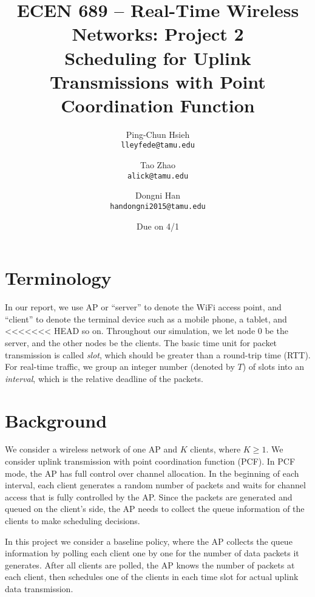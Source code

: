 \documentclass{article}
\begin{document}
\title{\bfseries ECEN 689 -- Real-Time Wireless Networks: Project 2\\
Scheduling for Uplink Transmissions with Point Coordination Function}
\date{Due on 4/1}
\author{%
Ping-Chun Hsieh\\
\texttt{lleyfede@tamu.edu}
\and
Tao Zhao\\
\texttt{alick@tamu.edu}
\and
Dongni Han\\
\texttt{handongni2015@tamu.edu}
}
\maketitle

\section*{Terminology}

In our report, we use AP or ``server'' to denote the WiFi access point, and
``client'' to denote the terminal device such as a mobile phone, a tablet, and
<<<<<<< HEAD
so on. Throughout our simulation, we let node $0$ be the server, and the other nodes be the clients. The basic time unit for packet transmission is called \emph{slot}, which should be greater than a round-trip time (RTT). For real-time traffic, we group an integer number (denoted by $T$) of slots into an \emph{interval}, which is the relative deadline of the packets.

\section{Background}

We consider a wireless network of one AP and $K$ clients,
where $K\ge1$. We consider uplink transmission with point coordination function (PCF).
In PCF mode, the AP has full control over channel allocation. In the beginning of each interval, each client generates a random number of packets and waits for channel access that is fully controlled by the AP. Since the packets are generated and queued on the client's side, the AP needs to collect the queue information of the clients to make scheduling decisions.

In this project we consider a baseline policy, where the AP collects the queue
information by polling each client one by one for the number of data packets it
generates.
After all clients are polled, the AP knows the number of packets at each client,
then schedules one of the clients in each time slot for actual uplink data transmission.
\end{document}
